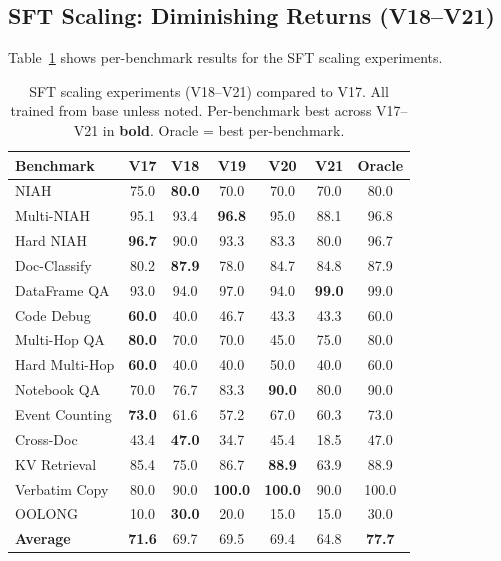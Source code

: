 \documentclass{article}
\begin{document}
\subsection{SFT Scaling: Diminishing Returns (V18--V21)}
\label{sec:sft-scaling}

Table~\ref{tab:scaling} shows per-benchmark results for the SFT scaling experiments.

\begin{table}[t]
\caption{SFT scaling experiments (V18--V21) compared to V17. All trained from base unless noted. Per-benchmark best across V17--V21 in \textbf{bold}. Oracle = best per-benchmark.}
\label{tab:scaling}
\vskip 0.15in
\begin{center}
\begin{small}
\begin{tabular}{lccccc|c}
\toprule
Benchmark & V17 & V18 & V19 & V20 & V21 & Oracle \\
\midrule
NIAH & 75.0 & \textbf{80.0} & 70.0 & 70.0 & 70.0 & 80.0 \\
Multi-NIAH & 95.1 & 93.4 & \textbf{96.8} & 95.0 & 88.1 & 96.8 \\
Hard NIAH & \textbf{96.7} & 90.0 & 93.3 & 83.3 & 80.0 & 96.7 \\
Doc-Classify & 80.2 & \textbf{87.9} & 78.0 & 84.7 & 84.8 & 87.9 \\
DataFrame QA & 93.0 & 94.0 & 97.0 & 94.0 & \textbf{99.0} & 99.0 \\
Code Debug & \textbf{60.0} & 40.0 & 46.7 & 43.3 & 43.3 & 60.0 \\
Multi-Hop QA & \textbf{80.0} & 70.0 & 70.0 & 45.0 & 75.0 & 80.0 \\
Hard Multi-Hop & \textbf{60.0} & 40.0 & 40.0 & 50.0 & 40.0 & 60.0 \\
Notebook QA & 70.0 & 76.7 & 83.3 & \textbf{90.0} & 80.0 & 90.0 \\
Event Counting & \textbf{73.0} & 61.6 & 57.2 & 67.0 & 60.3 & 73.0 \\
Cross-Doc & 43.4 & \textbf{47.0} & 34.7 & 45.4 & 18.5 & 47.0 \\
KV Retrieval & 85.4 & 75.0 & 86.7 & \textbf{88.9} & 63.9 & 88.9 \\
Verbatim Copy & 80.0 & 90.0 & \textbf{100.0} & \textbf{100.0} & 90.0 & 100.0 \\
OOLONG & 10.0 & \textbf{30.0} & 20.0 & 15.0 & 15.0 & 30.0 \\
\midrule
\textbf{Average} & \textbf{71.6} & 69.7 & 69.5 & 69.4 & 64.8 & \textbf{77.7} \\
\bottomrule
\end{tabular}
\end{small}
\end{center}
\vskip -0.15in
\end{table}
\end{document}
